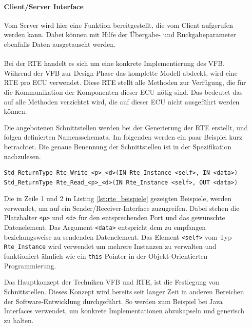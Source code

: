 \documentclass[
  a4paper,					    %
  twoside,
  DIV=calc,     				%
  bibliography=totoc,
  cleardoublepage=empty,
  ngerman,     					%
  final       					%
]{scrbook}
\begin{document}
\paragraph{Client/Server Interface}
Vom Server wird hier eine Funktion bereitgestellt, die vom Client aufgerufen werden kann. Dabei können mit Hilfe der Übergabe- und Rückgabeparameter ebenfalls Daten ausgetauscht werden.

\paragraph*{}
Bei der RTE handelt es sich um eine konkrete Implementierung des VFB. Während der VFB zur Design-Phase das komplette Modell abdeckt, wird eine RTE pro ECU verwendet. Diese RTE stellt alle Methoden zur Verfügung, die für die Kommunikation der Komponenten dieser ECU nötig sind. Das bedeutet das auf alle Methoden verzichtet wird, die auf dieser ECU nicht ausgeführt werden können.

Die angebotenen Schnittstellen werden bei der Generierung der RTE erstellt, und folgen definierten Namensschemata. Im folgenden werden ein paar Beispiel kurz betrachtet. Die genaue Benennung der Schnittstellen ist in der Spezifikation nachzulesen.

\begin{lstlisting}[frame=single, basicstyle=\footnotesize, caption={RTE Beispiele}, label={lst:rte_beispiele}]
Std_ReturnType Rte_Write_<p>_<d>(IN Rte_Instance <self>, IN <data>)
Std_ReturnType Rte_Read_<p>_<d>(IN Rte_Instance <self>, OUT <data>)
\end{lstlisting}

Die in Zeile 1 und 2 in Listing \ref{lst:rte_beispiele} gezeigten Beispiele, werden verwendet, um auf ein Sender/Receiver-Interface zuzugreifen. Dabei stehen die Platzhalter \texttt{<p>} und \texttt{<d>} für den entsprechenden Port und das gewünschte Datenelement. Das Argument \texttt{<data>} entspricht dem zu empfangen beziehungsweise zu sendenden Datenelement. Das Element \texttt{<self>} vom Typ \texttt{Rte\_Instance} wird verwendet um mehrere Instanzen zu verwalten und funktioniert ähnlich wie ein \texttt{this}-Pointer in der Objekt-Orientierten-Programmierung.

Das Hauptkonzept der Techniken VFB und RTE, ist die Festlegung von Schnittstellen. Dieses Konzept wird bereits seit langer Zeit in anderen Bereichen der Software-Entwicklung durchgeführt. So werden zum Beispiel bei Java Interfaces verwendet, um konkrete Implementationen abzukapseln und generisch zu halten. 
\end{document}
